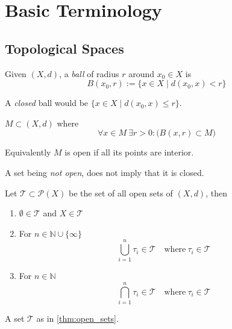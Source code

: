 \section{Basic Terminology}
\subsection{Topological Spaces}
\begin{definition}
   Given \((X, d)\), a \emph{ball} of radius \(r\) around \(x_0 \in X\) is
   \[B(x_0, r) := \{x \in X \mid d(x_0, x) < r\}\]
\end{definition}
\begin{remark}
   A \emph{closed} ball would be \(\{x \in X \mid d(x_0, x) \leq r\}\).
\end{remark}

\begin{definition}
   \(M \subset (X, d)\) where
   \[\forall x \in M~\exists r > 0: \big(B(x, r) \subset M\big)\]
\end{definition}
\begin{remark}
   Equivalently \(M\) is open if all its points are interior.
\end{remark}
\begin{remark}
   A set being \emph{not open}, does not imply that it is closed.
\end{remark}

\begin{theorem}\label{thm:open_sets}
   Let \(\mathcal{T} \subset \mathcal{P}(X)\) be the set of all open sets of \((X, d)\), then
   \begin{enumerate}[label=\roman*, align=Center]
      \item \(\emptyset \in \mathcal{T}\) and \(X \in \mathcal{T}\)
      \item For \(n \in \mathbb{N} \cup \{\infty\}\)
         \[\bigcup_{i=1}^n \tau_i \in \mathcal{T} \quad\text{where}~\tau_i \in \mathcal{T}\]
      \item For \(n \in \mathbb{N}\)
         \[\bigcap_{i=1}^n \tau_i \in \mathcal{T} \quad\text{where}~\tau_i \in \mathcal{T}\]
   \end{enumerate}
\end{theorem}

\begin{definition}[Topology]
   A set \(\mathcal{T}\) as in \cref{thm:open_sets}.
\end{definition}

